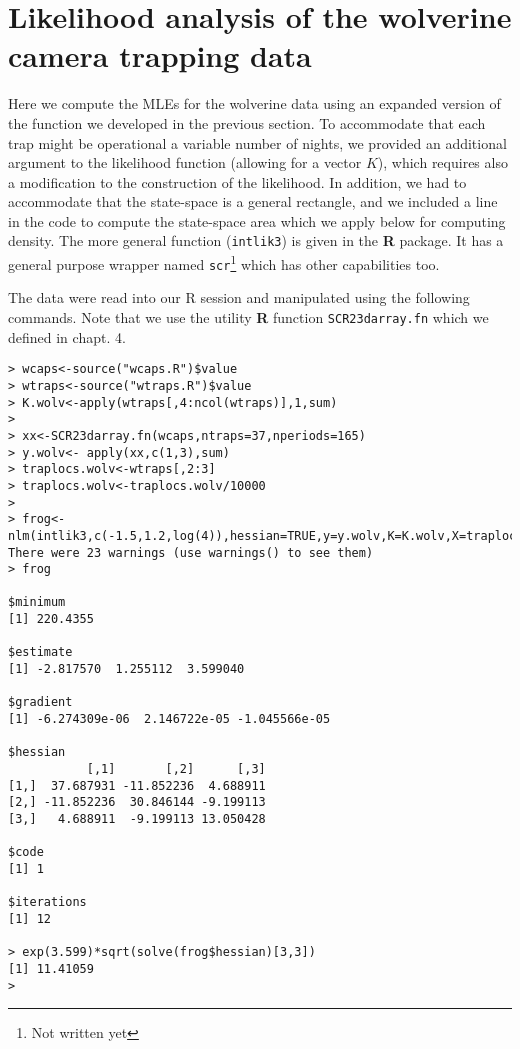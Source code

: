 \section{Likelihood analysis of the wolverine camera trapping data}
\label{mle.sec.wolverine}


Here we compute the MLEs for the wolverine data using an expanded
version of the function we developed in the previous section. To
accommodate that each trap might be operational a variable number of
nights, we provided an additional argument to the likelihood function
(allowing for a vector $K$), which requires also a modification to the
construction of the likelihood.  In addition,
we had to accommodate that the state-space is a general rectangle, and
we included a line in the code to compute the state-space area which
we apply below for computing density.  The more general function
(\mbox{\tt intlik3}) is given in the {\bf R} package. It has a general
purpose wrapper named \mbox{\tt scr}\footnote{Not written yet} which has other capabilities too. 

The data were read into our R session and manipulated using the
following commands. Note that we use the utility {\bf R} function
\mbox{\tt SCR23darray.fn} which we defined in chapt. 4.

\begin{verbatim}
> wcaps<-source("wcaps.R")$value
> wtraps<-source("wtraps.R")$value
> K.wolv<-apply(wtraps[,4:ncol(wtraps)],1,sum)
> 
> xx<-SCR23darray.fn(wcaps,ntraps=37,nperiods=165)
> y.wolv<- apply(xx,c(1,3),sum)
> traplocs.wolv<-wtraps[,2:3]
> traplocs.wolv<-traplocs.wolv/10000
>
> frog<-nlm(intlik3,c(-1.5,1.2,log(4)),hessian=TRUE,y=y.wolv,K=K.wolv,X=traplocs.wolv,delta=.1,ssbuffer=2)
There were 23 warnings (use warnings() to see them)
> frog

$minimum
[1] 220.4355

$estimate
[1] -2.817570  1.255112  3.599040

$gradient
[1] -6.274309e-06  2.146722e-05 -1.045566e-05

$hessian
           [,1]       [,2]      [,3]
[1,]  37.687931 -11.852236  4.688911
[2,] -11.852236  30.846144 -9.199113
[3,]   4.688911  -9.199113 13.050428

$code
[1] 1

$iterations
[1] 12

> exp(3.599)*sqrt(solve(frog$hessian)[3,3])
[1] 11.41059
> 

\end{verbatim}

